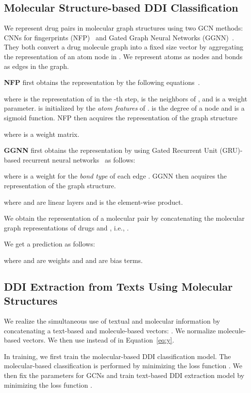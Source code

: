 \documentclass[11pt,a4paper]{article}
\begin{document}
\subsection{Molecular Structure-based DDI Classification}

We represent drug pairs in molecular graph structures using two GCN methods: CNNs for fingerprints (NFP)~\cite{NIPS2015_5954} and Gated Graph Neural Networks (GGNN)~\cite{li2015gated}. They both convert a drug molecule graph  into a fixed size vector  by aggregating the representation  of an atom node  in . 
We represent atoms as nodes and bonds as edges in the graph.

\textbf{NFP} first obtains the representation  by the following equations~\cite{NIPS2015_5954}.

where  is the representation of  in the -th step,  is the neighbors of , 
and  is a weight parameter.
 is initialized by the \textit{atom features} of .  is the degree of a node  and  is a sigmoid function.
NFP then acquires the representation of the graph structure 

where  is a weight matrix.

\textbf{GGNN} first obtains the representation  by using Gated Recurrent Unit (GRU)-based recurrent neural networks~\citep{li2015gated} as follows:

where  is a weight for the \textit{bond type} of each edge .
GGNN then acquires the representation of the graph structure.

where  and  are linear layers and  is the element-wise product.

We obtain the representation of a molecular pair by concatenating the molecular graph representations of drugs  and , i.e., . 

We get a prediction  as follows:

where  and  are weights and  and  are bias terms.

\subsection{DDI Extraction from Texts Using Molecular Structures}

We realize the simultaneous use of textual and molecular information by concatenating a text-based and molecule-based vectors: 
. 
We normalize molecule-based vectors. We then use  instead of  in Equation~\ref{eq:y}. 

In training, we first train the molecular-based DDI classification model.
The molecular-based classification is performed by minimizing the loss function 
.
We then fix the parameters for GCNs and train text-based DDI extraction model by minimizing the loss function 
.
\end{document}
